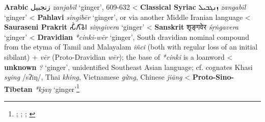 \begin{etymology}\label{ety:zanjabil}
\textbf{Arabic} {زنجبيل} \textit{zanjabīl} `ginger', 609-632
< \textbf{Classical Syriac} {ܙܢܓܒܝܠ} \textit{zangabīl} `ginger'
< \textbf{Pahlavi} \textit{singibēr} `ginger', or via another Middle Iranian language
< \textbf{Sauraseni Prakrit} {𑀲𑀺𑀁𑀕𑀺𑀯𑁂𑀭} \textit{siṃgivera} `ginger'
< \textbf{Sanskrit} {शृङ्गवेर} \textit{śṛṅgavera} `ginger'
< \textbf{Dravidian} \textit{*cinki-wēr} `ginger', South dravidian nominal compound  from the etyma of Tamil and Malayalam \textit{iñci} (both with regular loss of an initial sibilant) + \textit{vēr} (Proto-Dravidian \textit{wēr}); the base of \textit{*cinki} is a loanword
< \textbf{unknown} \textit{?} `ginger', unidentified Southeast Asian language; cf. cognates Khasi \textit{sying} /sʔiŋ/, Thai \textit{khing}, Vietnamese \textit{gừng}, Chinese \textit{jiāng}
< \textbf{Proto-Sino-Tibetan} \textit{*kjaŋ} `ginger'\footnote{\textcite{cal}; \textcite[90]{ciancaglini_iranian_2008}; \textcite[5]{krishnamurti_dravidian_2003}; \textcite{oed}}
\end{etymology}